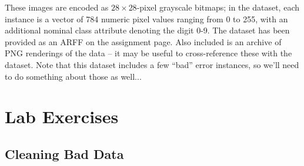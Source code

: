 \documentclass[11pt]{cselabheader}
\begin{document}
These images are encoded as $28 \times 28$-pixel grayscale bitmaps; in the dataset, each instance is a vector of 784 numeric pixel values ranging from 0 to 255, with an additional nominal class attribute denoting the digit 0-9. The dataset has been provided as an ARFF on the assignment page. Also included is an archive of PNG renderings of the data -- it may be useful to cross-reference these with the dataset. Note that this dataset includes a few ``bad'' error instances, so we'll need to do something about those as well...

\pagebreak

\section{Lab Exercises}

\subsection{Cleaning Bad Data}
\end{document}
